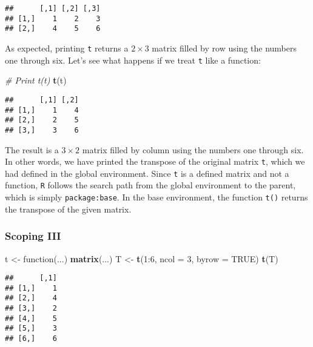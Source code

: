 \documentclass[11,]{article}
\newenvironment{Shaded}{\begin{snugshade}}{\end{snugshade}}
\newcommand{\KeywordTok}[1]{\textcolor[rgb]{0.13,0.29,0.53}{\textbf{{#1}}}}
\newcommand{\DataTypeTok}[1]{\textcolor[rgb]{0.13,0.29,0.53}{{#1}}}
\newcommand{\DecValTok}[1]{\textcolor[rgb]{0.00,0.00,0.81}{{#1}}}
\newcommand{\StringTok}[1]{\textcolor[rgb]{0.31,0.60,0.02}{{#1}}}
\newcommand{\CommentTok}[1]{\textcolor[rgb]{0.56,0.35,0.01}{\textit{{#1}}}}
\newcommand{\OtherTok}[1]{\textcolor[rgb]{0.56,0.35,0.01}{{#1}}}
\newcommand{\NormalTok}[1]{{#1}}
\begin{document}
\begin{verbatim}
##      [,1] [,2] [,3]
## [1,]    1    2    3
## [2,]    4    5    6
\end{verbatim}

As expected, printing \texttt{t} returns a \(2\times3\) matrix filled by
row using the numbers one through six. Let's see what happens if we
treat \texttt{t} like a function:

\begin{Shaded}
\begin{Highlighting}[]
\CommentTok{# Print t(t)}
\KeywordTok{t}\NormalTok{(t)}
\end{Highlighting}
\end{Shaded}

\begin{verbatim}
##      [,1] [,2]
## [1,]    1    4
## [2,]    2    5
## [3,]    3    6
\end{verbatim}

The result is a \(3\times2\) matrix filled by column using the numbers
one through six. In other words, we have printed the transpose of the
original matrix \texttt{t}, which we had defined in the global
environment. Since \texttt{t} is a defined matrix and not a function,
\texttt{R} follows the search path from the global environment to the
parent, which is simply \texttt{package:base}. In the base environment,
the function \texttt{t()} returns the transpose of the given matrix.

\subsubsection{Scoping III}\label{scoping-iii}

\begin{Shaded}
\begin{Highlighting}[]
\NormalTok{t <-}\StringTok{ }\NormalTok{function(...) }\KeywordTok{matrix}\NormalTok{(...)}
\NormalTok{T <-}\StringTok{ }\KeywordTok{t}\NormalTok{(}\DecValTok{1}\NormalTok{:}\DecValTok{6}\NormalTok{, }\DataTypeTok{ncol =} \DecValTok{3}\NormalTok{, }\DataTypeTok{byrow =} \OtherTok{TRUE}\NormalTok{)}
\KeywordTok{t}\NormalTok{(T)}
\end{Highlighting}
\end{Shaded}

\begin{verbatim}
##      [,1]
## [1,]    1
## [2,]    4
## [3,]    2
## [4,]    5
## [5,]    3
## [6,]    6
\end{verbatim}
\end{document}
